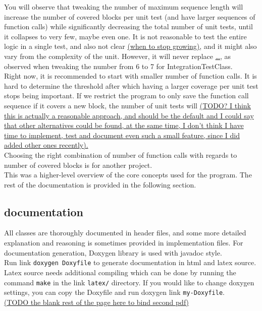 \documentclass{elteikthesis}[2018/06/06]
\begin{document}
You will observe that tweaking the number of maximum sequence length will increase the number of covered blocks per unit test (and have larger sequences of function calls) while significantly decreasing the total number of unit tests, until it collapses to very few, maybe even one. It is not reasonable to test the entire logic in a single test, and also not clear \uline{(when to stop growing)}, and it might also vary from the complexity of the unit. However, it will never replace \uline{\ldots{}}, as observed when tweaking the number from 6 to 7 for IntegrationTestClass. \\
Right now, it is recommended to start with smaller number of function calls. It is hard to determine the threshold after which having a larger coverage per unit test stops being important. If we restrict the program to only save the function call sequence if it covers a new block, the number of unit tests will \uline{(TODO? I think this is actually a reasonable approach, and should be the default and I could say that other alternatives could be found, at the same time, I don't think I have time to implement, test and document even such a small feature, since I did added other ones recently).}  \\
Choosing the right combination of number of function calls with regards to number of covered blocks is for another project. \\

This was a higher-level overview of the core concepts used for the program. The rest of the documentation is provided in the following section. \\
\subsection{documentation}
\label{sec-3-2-3}
All classes are thoroughly documented in header files, and some more detailed explanation and reasoning is sometimes provided in implementation files. For documentation generation, Doxygen library is used with javadoc style. \\

Run link \texttt{doxygen Doxyfile} to generate documentation in html and latex source. Latex source needs additional compiling which can be done by running the command \lstinline{make} in the link \texttt{latex/} directory. If you would like to change doxygen settings, you can copy the Doxyfile and run doxygen link \texttt{my-Doxyfile}. \\

\uline{(TODO the blank rest of the page here to bind second pdf)} \\
\end{document}
